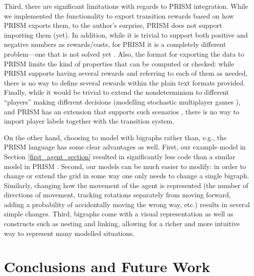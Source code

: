 \documentclass[runningheads]{llncs}
\begin{document}
Third, there are significant limitations with regards to PRISM integration.
While we implemented the functionality to export transition rewards based on how
PRISM exports them, to the author's surprise, PRISM does not support importing
them (yet). In addition, while it is trivial to support both positive and
negative numbers as rewards/costs, for PRISM it is a completely different
problem---one that is not solved yet \cite{DBLP:conf/tacas/0001BCDDKM016}. Also,
the format for exporting the data to PRISM limits the kind of properties that
can be computed or checked: while PRISM supports having several rewards and
referring to each of them as needed, there is no way to define several rewards
within the plain text formats provided. Finally, while it would be trivial to
extend the nondeterminism to different ``players'' making different decisions
(modelling stochastic multiplayer games \cite{DBLP:phd/dnb/Ummels11}), and PRISM
has an extension that supports such scenarios \cite{DBLP:conf/tacas/ChenFKPS13},
there is no way to import player labels together with the transition system.

On the other hand, choosing to model with bigraphs rather than, e.g., the
PRISM language has some clear advantages as well. First, our example model in
Section \ref{first_agent_section} resulted in significantly less code than a
similar model in PRISM \cite{dblp:conf/nfm/giaquintahimn18}. Second, our models
can be much easier to modify: in order to change or extend the grid in some way
one only needs to change a single bigraph. Similarly, changing how the movement
of the agent is represented (the number of directions of movement, tracking
rotations separately from moving forward, adding a probability of accidentally
moving the wrong way, etc.) results in several simple changes. Third, bigraphs
come with a visual representation as well as constructs such as nesting and
linking, allowing for a richer and more intuitive way to represent many modelled
situations.

\section{Conclusions and Future Work}
\end{document}
